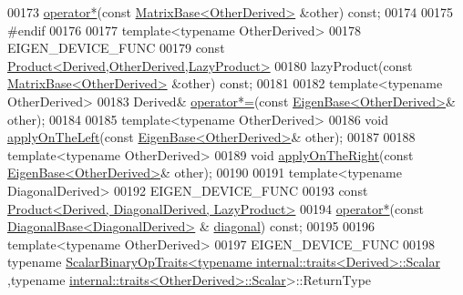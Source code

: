 \begin{DoxyCode}
00173     \hyperlink{group___core___module_ae2d220efbf7047f0894787888288cfcc}{operator*}(\textcolor{keyword}{const} \hyperlink{group___core___module_class_eigen_1_1_matrix_base}{MatrixBase<OtherDerived>} &other) \textcolor{keyword}{const};
00174 
00175 \textcolor{preprocessor}{#endif}
00176 
00177     \textcolor{keyword}{template}<\textcolor{keyword}{typename} OtherDerived>
00178     EIGEN\_DEVICE\_FUNC
00179     \textcolor{keyword}{const} \hyperlink{group___core___module_class_eigen_1_1_product}{Product<Derived,OtherDerived,LazyProduct>}
00180     lazyProduct(\textcolor{keyword}{const} \hyperlink{group___core___module_class_eigen_1_1_matrix_base}{MatrixBase<OtherDerived>} &other) \textcolor{keyword}{const};
00181 
00182     \textcolor{keyword}{template}<\textcolor{keyword}{typename} OtherDerived>
00183     Derived& \hyperlink{group___core___module_a3783b6168995ca117a1c19fea3630ac4}{operator*=}(\textcolor{keyword}{const} \hyperlink{group___core___module_struct_eigen_1_1_eigen_base}{EigenBase<OtherDerived>}& other);
00184 
00185     \textcolor{keyword}{template}<\textcolor{keyword}{typename} OtherDerived>
00186     \textcolor{keywordtype}{void} \hyperlink{group___core___module_a3a08ad41e81d8ad4a37b5d5c7490e765}{applyOnTheLeft}(\textcolor{keyword}{const} \hyperlink{group___core___module_struct_eigen_1_1_eigen_base}{EigenBase<OtherDerived>}& other);
00187 
00188     \textcolor{keyword}{template}<\textcolor{keyword}{typename} OtherDerived>
00189     \textcolor{keywordtype}{void} \hyperlink{group___core___module_a45d91752925d2757fc8058a293b15462}{applyOnTheRight}(\textcolor{keyword}{const} \hyperlink{group___core___module_struct_eigen_1_1_eigen_base}{EigenBase<OtherDerived>}& other);
00190 
00191     \textcolor{keyword}{template}<\textcolor{keyword}{typename} DiagonalDerived>
00192     EIGEN\_DEVICE\_FUNC
00193     \textcolor{keyword}{const} \hyperlink{group___core___module_class_eigen_1_1_product}{Product<Derived, DiagonalDerived, LazyProduct>}
00194     \hyperlink{group___core___module_ae2d220efbf7047f0894787888288cfcc}{operator*}(\textcolor{keyword}{const} \hyperlink{class_eigen_1_1_diagonal_base}{DiagonalBase<DiagonalDerived>} &
      \hyperlink{group___core___module_ab5768147536273eb2dbdfa389cfd26a3}{diagonal}) \textcolor{keyword}{const};
00195 
00196     \textcolor{keyword}{template}<\textcolor{keyword}{typename} OtherDerived>
00197     EIGEN\_DEVICE\_FUNC
00198     \textcolor{keyword}{typename} \hyperlink{group___core___module_struct_eigen_1_1_scalar_binary_op_traits}{ScalarBinaryOpTraits<typename internal::traits<Derived>::Scalar}
      ,\textcolor{keyword}{typename} \hyperlink{struct_eigen_1_1internal_1_1traits}{internal::traits<OtherDerived>::Scalar}>::ReturnType

\end{DoxyCode}
